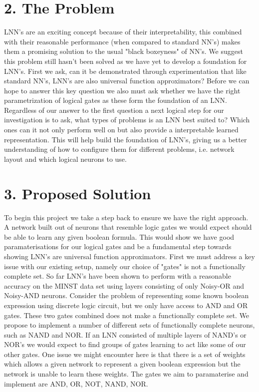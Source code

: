 \documentclass[11pt, a4paper, twoside, openright]{report}
\begin{document}
\section*{2. The Problem}

LNN's are an exciting concept because of their interpretability, this combined with their reasonable performance (when compared to standard NN's) makes them a promising solution to the usual "black boxeyness" of NN's. We suggest this problem still hasn't been solved as we have yet to develop a foundation for LNN's. First we ask, can it be demonstrated through experimentation that like standard NN's, LNN's are also universal function approximators?  Before we can hope to answer this key question we also must ask whether we have the right parametrization of logical gates as these form the foundation of an LNN. \\

Regardless of our answer to the first question a next logical step for our investigation is to ask, what types of problems is an LNN best suited to? Which ones can it not only perform well on but also provide a interpretable learned representation. This will help build the foundation of LNN's, giving us a better understanding of how to configure them for different problems, i.e. network layout and which logical neurons to use.\\

\section*{3. Proposed Solution}

To begin this project we take a step back to ensure we have the right approach. A network built out of neurons that resemble logic gates we would expect should be able to learn any given boolean formula. This would show we have good paramaterisations for our logical gates and be a fundamental step towards showing LNN's are universal function approximators. First we must address a key issue with our existing setup, namely our choice of "gates" is not a functionally complete set. So far LNN's have been shown to perform with a reasonable accuracy on the MINST data set using layers consisting of only Noisy-OR and Noisy-AND neurons. Consider the problem of representing some known boolean expression using discrete logic circuit, but we only have access to AND and OR gates. These two gates combined does not make a functionally complete set. We propose to implement a number of different sets of functionally complete neurons, such as NAND and NOR. If an LNN consisted of multiple layers of NAND's or NOR's we would expect to find groups of gates learning to act like some of our other gates. One issue we might encounter here is that there is a set of weights which allows a given network to represent a given boolean expression but the network is unable to learn these weights. The gates we aim to paramaterise and implement are AND, OR, NOT, NAND, NOR. \\
\end{document}
